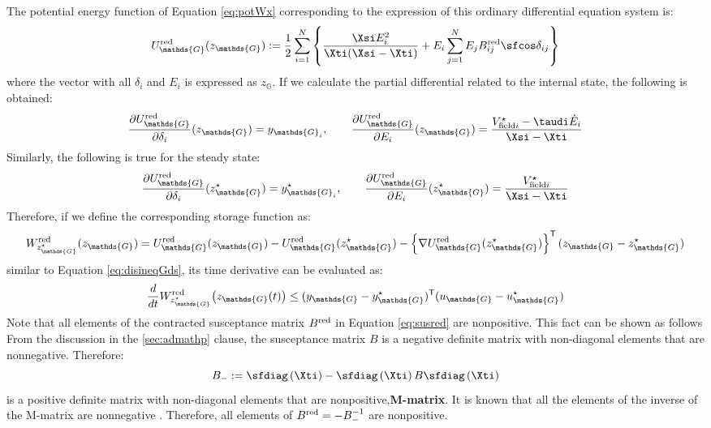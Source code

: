 \documentclass[graybox, envcountchap]{svmult}
\begin{document}
The potential energy function of Equation \ref{eq:potWx} corresponding to the expression of this ordinary differential equation system is:
\begin{align}\label{eq:potWxred}
U_{\mathds{G}}^{\rm red} (z_{\mathds{G}})  := 
 \frac{1}{2} 
\sum_{i=1}^N
\left\{
\frac{ \Xsi E_i^2 }{ \Xti ( \Xsi - \Xti )}  
+ E_i \sum_{j=1}^{N}
 E_j 
B_{ij}^{\rm red}
\sfcos \delta_{ij}
\right\}
\end{align}
where the vector with all $\delta_i$ and $E_i$ is expressed as $z_{\mathds{G}}$.
If we calculate the partial differential related to the internal state, the following is obtained:
\begin{align*}
\frac{\partial U_{\mathds{G}}^{\rm red} }{\partial \delta_i}(z_{\mathds{G}})  = y_{\mathds{G}_i}
,\qquad
\frac{\partial U_{\mathds{G}}^{\rm red} }{\partial E_i} (z_{\mathds{G}}) = 
\frac{V_{{\rm field}i}^{\star} - \taudi\dot{E}_i  }{ \Xsi - \Xti }
\end{align*}
Similarly, the following is true for the steady state:
\begin{align*}
\frac{\partial U_{\mathds{G}}^{\rm red} }{\partial \delta_i} ( z^{\star}_{\mathds{G}} )
= y_{\mathds{G}_i}^{\star}
,\qquad
\frac{\partial U_{\mathds{G}}^{\rm red} }{\partial E_i} ( z^{\star}_{\mathds{G}} ) = 
\frac{V_{{\rm field}i}^{\star}  }{ \Xsi - \Xti }
\end{align*}
Therefore, if we define the corresponding storage function as:
\[ 
W_{z^{\star}_{\mathds{G}}}^{\rm red} (z_{\mathds{G}}) = U_{\mathds{G}}^{\rm red} (z_{\mathds{G}}) 
- U_{\mathds{G}}^{\rm red} (z^{\star}_{\mathds{G}}) 
- \left\{ \nabla U_{\mathds{G}}^{\rm red}(z^{\star}_{\mathds{G}}) \right\}^{\sf T}
 (z_{\mathds{G}}-z^{\star}_{\mathds{G}})
\]
similar to Equation \ref{eq:disineqGds}, its time derivative can be evaluated as:
\[
\frac{d}{dt}W_{z^{\star}_{\mathds{G}}}^{\rm red} \bigl(z_{\mathds{G}}(t) \bigr)
 \leq 
(y_{\mathds{G}}-y_{\mathds{G}}^{\star})^{\sf T} (u_{\mathds{G}}- u_{\mathds{G}}^{\star})
\]
Note that all elements of the contracted susceptance matrix $B^{\rm red}$ in Equation \ref{eq:susred} are nonpositive.
This fact can be shown as follows
From the discussion in the \ref{sec:admathp} clause, the susceptance matrix $B$ is a negative definite matrix with non-diagonal elements that are nonnegative.
Therefore:
\[
B_{-}:= \sfdiag \left( \Xti \right)   
-
\sfdiag \left( \Xti \right) B \sfdiag \left( \Xti \right)
\]
is a positive definite matrix with non-diagonal elements that are nonpositive,\textbf{M-matrix}.
It is known that all the elements of the inverse of the M-matrix are nonnegative \cite{kodama1981system}.
Therefore, all elements of $B^{\rm red}=-B_-^{-1}$ are nonpositive.
\end{document}

